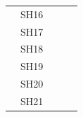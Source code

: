 \documentclass[]{book}
\begin{document}
\begin{table}[ht]
\begin{tabular}{|l|l|l|l|l|}
        & SH16                                  &                                    &                                                        &                                                                                                                                         \\ \cline{2-2}
        & SH17                                  &                                    &                                                        &                                                                                                                                         \\ \cline{2-2}
        & SH18                                  &                                    &                                                        &                                                                                                                                         \\ \cline{2-2}
        & SH19                                  &                                    &                                                        &                                                                                                                                         \\ \cline{2-2}
        & SH20                                  &                                    &                                                        &                                                                                                                                         \\ \cline{2-2}
        & SH21                                  &                                    &                                                        &                                                                                                                                         \\ \hline
    \end{tabular}
\end{table}
\end{document}
